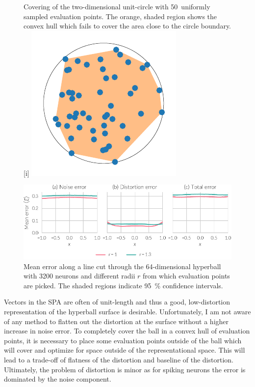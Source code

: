 \begin{figure}
    \begin{captionbeside}{Covering of the two-dimensional unit-circle with 50~uniformly sampled evaluation points. The orange, shaded region shows the convex hull which fails to cover the area close to the circle boundary.}[i]
        \includegraphics{figures/circle-covering}
    \end{captionbeside}\label{fig:circle-covering}
\end{figure}
\begin{figure}
    \centering
    \includegraphics{figures/error-radius-scale}
    \caption[Mean error along line cut through hyperball with scaled evaluation point radius]{Mean error along a line cut through the \num{64}-dimensional hyperball with \num{3200} neurons and different radii $r$ from which evaluation points are picked. The shaded regions indicate \SI{95}{\percent} confidence intervals.}\label{fig:error-radius-scale}
\end{figure}

Vectors in the SPA are often of unit-length and thus a good, low-distortion representation of the hyperball surface is desirable.
Unfortunately, I am not aware of any method to flatten out the distortion at the surface without a higher increase in noise error.
To completely cover the ball in a convex hull of evaluation points, it is necessary to place some evaluation points outside of the ball which will cover and optimize for space outside of the representational space.
This will lead to a trade-off of flatness of the distortion and baseline of the distortion.
Ultimately, the problem of distortion is minor as for spiking neurons the error is dominated by the noise component.


